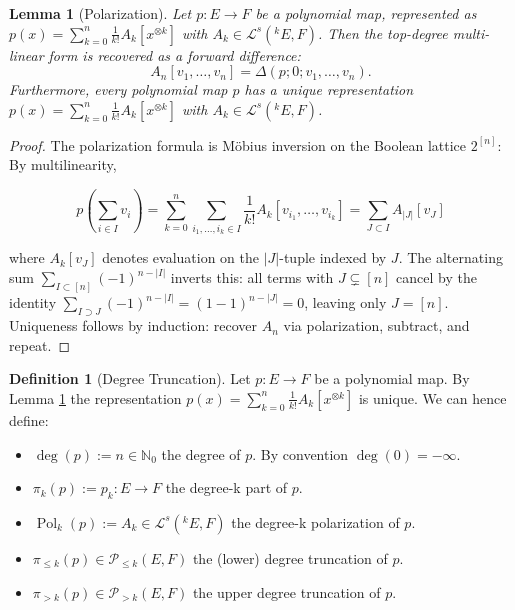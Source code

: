 \documentclass[10pt,a4paper]{article}
\theoremstyle{plain}
\newtheorem{lemma}[theorem]{Lemma}
\theoremstyle{definition}
\newtheorem{definition}[theorem]{Definition}
\newcommand{\IN}{\mathbb{N}} %
\newcommand{\1}{\mathbb{1}} %
\newcommand{\ra}{\rightarrow} %
\newcommand{\tensor}{\otimes} %
\newcommand{\KL}{\mathcal{L}}
\newcommand{\tightlist}{\setlength{\itemsep}{0pt}\setlength{\parskip}{0pt}}
\DeclareMathOperator{\Pol}{Pol} %
\begin{document}
\begin{lemma}[Polarization]

\label{lem:polarization} Let \(p: E \to F\) be a polynomial map,
represented as \(p(x) = \sum_{k=0}^n \frac{1}{k!} A_k[x^{\tensor k}]\)
with \(A_k \in \KL^s(^k E, F)\). Then the top-degree multi-linear form
is recovered as a forward difference: \[
  A_n[v_1,\dots,v_n] = \Delta(p; 0; v_1, \dots, v_n).
\] Furthermore, every polynomial map \(p\) has a unique representation
\(p(x) = \sum_{k=0}^n \frac{1}{k!} A_k[x^{\tensor k}]\) with
\(A_k \in \KL^s(^k E, F)\).

\end{lemma}

\begin{proof}

The polarization formula is Möbius inversion on the Boolean lattice
\(2^{[n]}\): By multilinearity,

\[
p(\sum_{i \in I} v_i) 
= \sum_{k=0}^n \sum_{i_1,\dots,i_k \in I}  \frac{1}{k!} A_k[v_{i_1},\dots,v_{i_k}] 
= \sum_{J \subset I} A_{|J|}[v_J]
\]

where \(A_k[v_J]\) denotes evaluation on the \(|J|\)-tuple indexed by
\(J\). The alternating sum \(\sum_{I \subset [n]} (-1)^{n-|I|}\) inverts
this: all terms with \(J \subsetneq [n]\) cancel by the identity
\(\sum_{I \supset J} (-1)^{n-|I|} = (1-1)^{n-|J|} = 0\), leaving only
\(J = [n]\). Uniqueness follows by induction: recover \(A_n\) via
polarization, subtract, and repeat.

\end{proof}

\begin{definition}[Degree Truncation]

Let \(p: E \ra F\) be a polynomial map. By Lemma \ref{lem:polarization}
the representation
\(p(x) = \sum_{k=0}^n  \frac{1}{k!} A_k[x^{\tensor k}]\) is unique. We
can hence define:

\begin{itemize}
\tightlist
\item
  \(\deg(p):= n \in \IN_0\) the degree of \(p\). By convention
  \(\deg(0) = - \infty\).
\item
  \(\pi_k(p) := p_k: E \ra F\) the degree-k part of \(p\).
\item
  \(\Pol_k(p) := A_k \in \KL^s(^k E, F)\) the degree-k polarization of
  \(p\).
\item
  \(\pi_{\leq k}(p) \in \mathcal{P}_{\le k}(E,F)\) the (lower) degree
  truncation of \(p\).
\item
  \(\pi_{> k}(p) \in \mathcal{P}_{> k}(E,F)\) the upper degree
  truncation of \(p\).
\end{itemize}

\end{definition}
\end{document}
